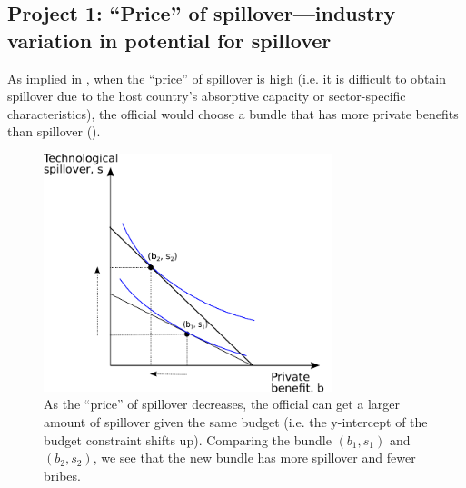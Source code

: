 \subsection{Project 1: ``Price'' of spillover---industry variation in potential for spillover}

As implied in , when the ``price'' of spillover is high (i.e. it is difficult to obtain spillover due to the host country's absorptive capacity or sector-specific characteristics), the official would choose a bundle that has more private benefits than spillover (). 

\begin{figure}[!ht]
	\centering
    \includegraphics[width=0.75\textwidth, height=0.75\textheight,keepaspectratio]{../figure/price_of_spillover}
    \caption{As the ``price'' of spillover decreases, the official can get a larger amount of spillover given the same budget (i.e. the y-intercept of the budget constraint shifts up). Comparing the bundle $(b_1, s_1)$ and $(b_2, s_2)$, we see that the new bundle has more spillover and fewer bribes.}
    \label{fig:price_of_spillover}
\end{figure}


